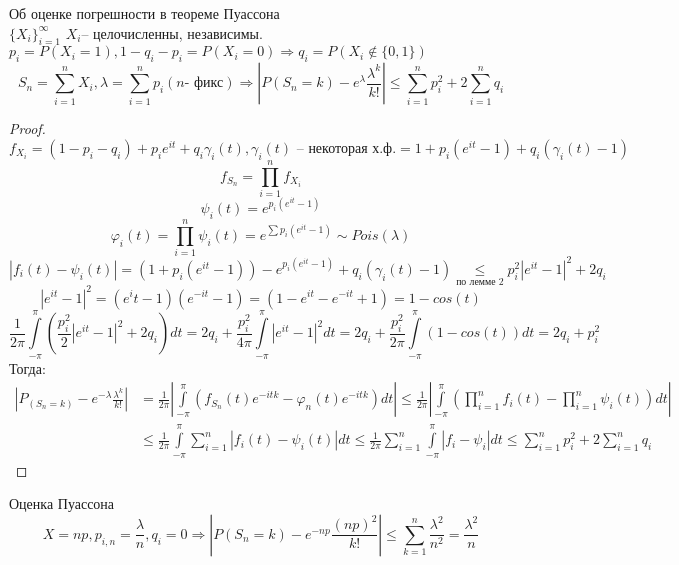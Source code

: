 \documentclass{article}
\begin{document}
    \begin{theorem}{Об оценке погрешности в теореме Пуассона}\\
    $\{X_i\}_{i=1}^\infty$ $X_i$-- целочисленны, независимы. $p_i = P(X_i=1), 1-q_i-p_i = P(X_i=0) \Rightarrow q_i = P(X_i \not\in \{0, 1\})$
    $$S_n = \sum\limits_{i=1}^n X_i, \lambda = \sum\limits_{i = 1}^n p_i (n \text{- фикс}) \Rightarrow |P(S_n = k) - e^\lambda \frac{\lambda^k}{k!}| \le\sum\limits_{i = 1}^n p_i^2 + 2 \sum\limits_{i = 1}^n q_i$$
    \begin{proof} %
    $$f_{X_i} = (1-p_i-q_i) + p_i e^{it} +q_i \gamma_i(t),  \gamma_i(t) \text{ -- некоторая х.ф.}  = 1 + p_i (e^{it} -1) + q_i (\gamma_i(t) - 1) $$
    $$f_{S_n} = \prod_{i=1}^n f_{X_i}$$
    $$\psi_i(t) = e^{p_i (e^{it} -1)}$$
    $$\varphi_i(t)=\prod_{i=1}^n \psi_i(t) = e^{\sum p_i (e^{it} -1)} \sim Pois(\lambda)$$
    $$ |f_i(t) - \psi_i(t)| = (1+ p_i(e^{it} - 1)) - e^{p_i(e^{it} - 1)} + q_i (\gamma_i(t) - 1) \underset{\text{по лемме 2}}{\le} p_i^2 | e^{it} - 1|^2 + 2q_i$$
    $$ |e^{it} -1|^2  = (e^it - 1) (e^{-it} -1) = (1 - e^{it} - e^{-it} + 1) = 1 - cos(t) $$
    $$ \frac{1}{2\pi} \int\limits_{-\pi}^\pi  (\frac{p_i^2}{2} 
    |e^{it} - 1|^2 + 2 q_i)dt = 2q_i + \frac{p_i^2}{4\pi} \int\limits_{-\pi}^\pi |e^{it} -1|^2 dt = 2q_i + \frac{p_i^2}{2\pi}\int\limits_{-\pi}^\pi (1 - cos(t)) dt = 2q_i + p_i^2 $$
    Тогда:
    \begin{align*}     
    |P_(S_n = k) -e^{-\lambda} \frac{\lambda^k}{k!}| &= \frac{1}{2\pi} |\int\limits_{-\pi}^\pi (f_{S_n} (t) e^{-itk} - \varphi_n (t) e^{-itk}) dt| \le \frac{1}{2\pi} |\int\limits_{-\pi}^\pi (\prod_{i=1}^n f_{i} (t) - \prod_{i=1}^n \psi_{i} (t)) dt| \\
    &\le \frac{1}{2\pi} \int\limits_{-\pi}^\pi \sum_{i=1}^n |f_i(t) -\psi_i(t)| dt \le \frac{1}{2\pi }  \sum_{i=1}^n\int\limits_{-\pi}^\pi |f_i-\psi_i|dt \le \sum_{i=1}^n p_i^2 + 2 \sum_{i=1}^n q_i
    \end{align*} 
    \end{proof}
    \end{theorem}
    \begin{corollary}{Оценка Пуассона}\\
        $$X = np, p_{i,n} = \frac{\lambda}{n}, q_i=0 \Rightarrow |P(S_n=k) - e^{-np}\frac{(np)^2}{k!}| \le \sum_{k=1}^n \frac{\lambda^2}{n^2} = \frac{\lambda^2}{n}$$
   \end{corollary}
\end{document}
